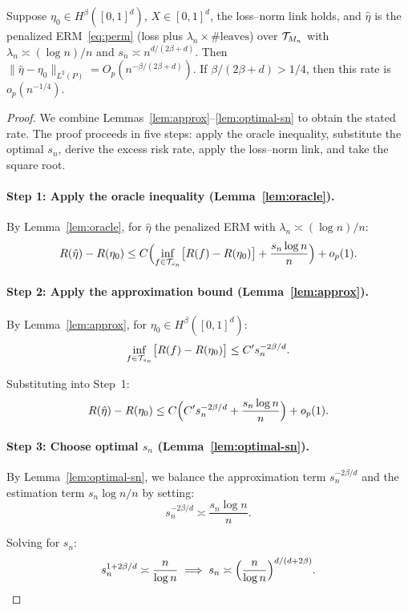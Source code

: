 \documentclass[12pt]{article}
\begin{document}
\begin{theorem}
\label{thm:nuisance-rate}
Suppose $\eta_0 \in H^\beta([0,1]^d)$, $X \in [0,1]^d$, the loss--norm link holds, and $\hat\eta$ is the penalized ERM~\eqref{eq:perm} (loss plus $\lambda_n \times \#\text{leaves}$) over $\mathcal{T}_{M_n}$ with $\lambda_n \asymp (\log n)/n$ and $s_n \asymp n^{d/(2\beta+d)}$. Then $\|\hat\eta - \eta_0\|_{L^2(P)} = O_p(n^{-\beta/(2\beta+d)})$. If $\beta/(2\beta+d) > 1/4$, then this rate is $o_p(n^{-1/4})$.
\end{theorem}
\begin{proof}
We combine Lemmas~\ref{lem:approx}--\ref{lem:optimal-sn} to obtain the stated rate. The proof proceeds in five steps: apply the oracle inequality, substitute the optimal $s_n$, derive the excess risk rate, apply the loss--norm link, and take the square root.

\paragraph{Step 1: Apply the oracle inequality (Lemma~\ref{lem:oracle}).}
By Lemma~\ref{lem:oracle}, for $\hat\eta$ the penalized ERM with $\lambda_n \asymp (\log n)/n$:
\[
R(\hat\eta) - R(\eta_0) \le C \Bigl( \inf_{f \in \mathcal{T}_{s_n}} \bigl[ R(f) - R(\eta_0) \bigr] + \frac{s_n \log n}{n} \Bigr) + o_p(1).
\]

\paragraph{Step 2: Apply the approximation bound (Lemma~\ref{lem:approx}).}
By Lemma~\ref{lem:approx}, for $\eta_0 \in H^\beta([0,1]^d)$:
\[
\inf_{f \in \mathcal{T}_{s_n}} \bigl[ R(f) - R(\eta_0) \bigr] \le C' s_n^{-2\beta/d}.
\]

Substituting into Step~1:
\[
R(\hat\eta) - R(\eta_0) \le C \Bigl( C' s_n^{-2\beta/d} + \frac{s_n \log n}{n} \Bigr) + o_p(1).
\]

\paragraph{Step 3: Choose optimal $s_n$ (Lemma~\ref{lem:optimal-sn}).}
By Lemma~\ref{lem:optimal-sn}, we balance the approximation term $s_n^{-2\beta/d}$ and the estimation term $s_n \log n / n$ by setting:
\[
s_n^{-2\beta/d} \asymp \frac{s_n \log n}{n}.
\]

Solving for $s_n$:
\[
s_n^{1 + 2\beta/d} \asymp \frac{n}{\log n} \implies s_n \asymp \Bigl( \frac{n}{\log n} \Bigr)^{d/(d + 2\beta)}.
\]


\end{proof}
\end{document}
